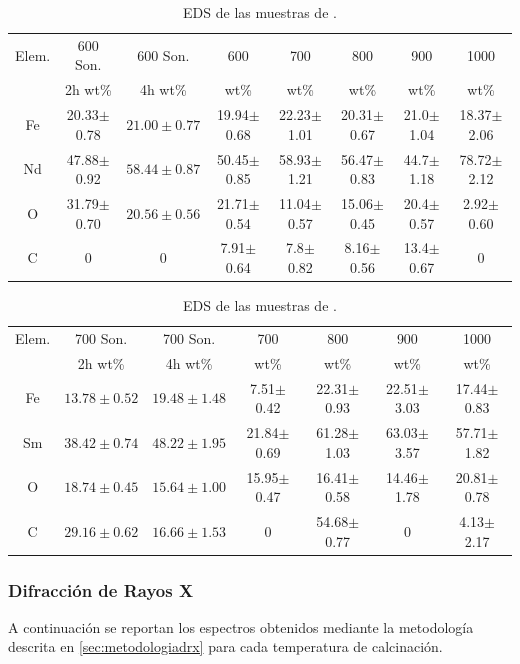 \documentclass[../main.tex]{subfiles}
\begin{document}
\begin{table}[H]
    \begin{tabular}{|c||c|c|c|c|c|c|c|}
        \hline
        Elem. &600\gradoC{} Son.&600\gradoC{} Son.&600\gradoC{}&700\gradoC{}&800\gradoC{}&900\gradoC{}&1000\gradoC{}\\
        &2h wt\%&4h wt\%&wt\%&wt\%&wt\%&wt\%&wt\%\\
        \hline\hline
        Fe & 20.33$\pm$0.78 &$21.00\pm0.77$& 19.94$\pm$0.68 & 22.23$\pm$1.01 & 20.31$\pm$0.67 & 21.0$\pm$1.04 & 18.37$\pm$2.06 \\
        Nd & 47.88$\pm$0.92 &$58.44\pm0.87$& 50.45$\pm$0.85 & 58.93$\pm$1.21 & 56.47$\pm$0.83 & 44.7$\pm$1.18 & 78.72$\pm$2.12 \\
        O & 31.79$\pm$0.70 &$20.56\pm0.56$& 21.71$\pm$0.54 & 11.04$\pm$0.57 & 15.06$\pm$0.45 & 20.4$\pm$0.57 & 2.92$\pm$0.60 \\
        C & 0 & 0 & 7.91$\pm$0.64 & 7.8$\pm$0.82 & 8.16$\pm$0.56 & 13.4$\pm$0.67 &0 \\ 
        \hline
        \end{tabular} 
            \caption{EDS de las muestras de \neod{}.}
            \label{tab:EDSNd}
        \end{table}
        \begin{table}[H]
            \centering
        \begin{tabular}{|c||c|c|c|c|c|c|}
        \hline
        Elem. &700\gradoC{} Son.&700\gradoC{} Son.&700\gradoC{}&800\gradoC{}&900\gradoC{}&1000\gradoC{}\\
        &2h wt\%&4h wt\%&wt\%&wt\%&wt\%&wt\%\\
        \hline\hline
        Fe &$13.78\pm0.52$&$19.48\pm1.48$& 7.51$\pm$0.42 & 22.31$\pm$0.93 & 22.51$\pm$3.03 & 17.44$\pm$0.83 \\
        Sm &$38.42\pm0.74$&$48.22\pm1.95$& 21.84$\pm$0.69 & 61.28$\pm$1.03 & 63.03$\pm$3.57 & 57.71$\pm$1.82 \\
        O &$18.74\pm0.45$&$15.64\pm1.00$& 15.95$\pm$0.47 & 16.41$\pm$0.58 & 14.46$\pm$1.78 & 20.81$\pm$0.78 \\
        C &$29.16\pm0.62$&$16.66\pm1.53$& 0 & 54.68$\pm$0.77 & 0 & 4.13$\pm$2.17 \\ 
        \hline
        \end{tabular} 
            \caption{EDS de las muestras de \sama{}.}
            \label{tab:EDSSm}
\end{table}
\subsubsection{Difracción de Rayos X} \label{sec:analisisDRX}
A continuación se reportan los espectros obtenidos mediante la metodología descrita en \ref{sec:metodologiadrx} para cada temperatura de calcinación.
\end{document}
